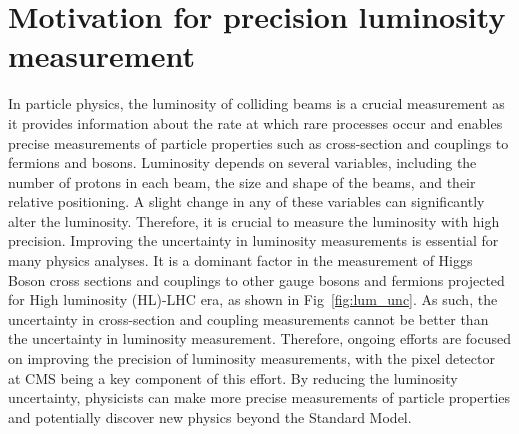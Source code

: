 \section{Motivation for precision luminosity measurement}


In particle physics, the luminosity of colliding beams is a crucial measurement as it provides information about the rate at which rare processes occur and enables precise measurements of particle properties such as cross-section and couplings to fermions and bosons. Luminosity depends on several variables, including the number of protons in each beam, the size and shape of the beams, and their relative positioning. A slight change in any of these variables can significantly alter the luminosity.
Therefore, it is crucial to measure the luminosity with high precision.
Improving the uncertainty in luminosity measurements is essential for many physics analyses.
It is a dominant factor in the measurement of Higgs Boson cross sections and couplings to other gauge bosons and fermions projected for High luminosity (HL)-LHC era, as shown in Fig~\ref{fig:lum_unc}. As such, the uncertainty in cross-section and coupling measurements cannot be better than the uncertainty in luminosity measurement. Therefore, ongoing efforts are focused on improving the precision of luminosity measurements, with the pixel detector at CMS being a key component of this effort. By reducing the luminosity uncertainty, physicists can make more precise measurements of particle properties and potentially discover new physics beyond the Standard Model.

